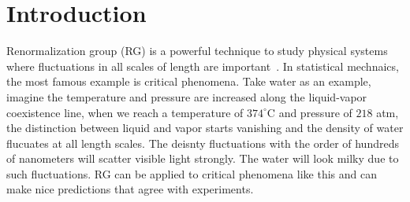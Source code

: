 \documentclass[aps,prb,reprint,superscriptaddress]{revtex4-2}
\begin{document}

\maketitle

\section{Introduction\label{intro}}
Renormalization group (RG) is a powerful technique to study physical
systems where fluctuations in all scales of length are
important~\cite{wilsonNobel}. In statistical mechnaics, the most famous
example is critical phenomena. Take water as an example, imagine the
temperature and pressure are increased along the liquid-vapor
coexistence line, when we reach a temperature of $374^\circ$C and
pressure of $218$ atm, the distinction between liquid and vapor starts
vanishing and the density of water flucuates at all length scales. The
deisnty fluctuations with the order of hundreds of nanometers will
scatter visible light strongly. The water will look milky due to such
fluctuations. RG can be applied to critical phenomena like this and can
make nice predictions that agree with experiments. 
%
\end{document}
